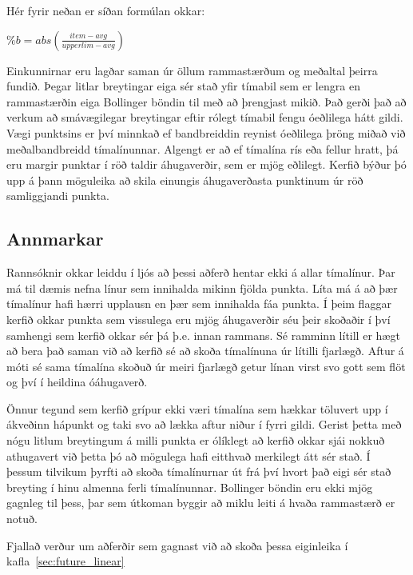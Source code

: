 \documentclass{article}
\begin{document}
Hér fyrir neðan er síðan formúlan okkar:


\begin{center}
  $\%b=abs(\frac{item - avg}{upperlim - avg})$
\end{center}

Einkunnirnar eru lagðar saman úr öllum rammastærðum og meðaltal þeirra fundið.
Þegar litlar breytingar eiga sér stað yfir tímabil sem er lengra en rammastærðin eiga
Bollinger böndin til með að þrengjast mikið. Það gerði það að verkum að smávægilegar breytingar eftir
rólegt tímabil fengu óeðlilega hátt gildi. 
Vægi punktsins er því minnkað ef bandbreiddin reynist óeðlilega þröng miðað við meðalbandbreidd
tímalínunnar.
Algengt er að ef tímalína rís eða fellur hratt, þá eru margir punktar í röð
taldir áhugaverðir, sem er mjög eðlilegt.
Kerfið býður þó upp á þann möguleika að skila einungis áhugaverðasta punktinum
úr röð samliggjandi punkta.

\subsection{Annmarkar}

Rannsóknir okkar leiddu í ljós að þessi aðferð hentar ekki á allar tímalínur.
Þar má til dæmis nefna línur sem innihalda mikinn fjölda punkta.
Líta má á að þær tímalínur hafi \ilqq hærri\irqq \hspace{1pt} upplausn en þær sem innihalda fáa punkta. 
Í þeim flaggar kerfið okkar punkta sem vissulega eru mjög
áhugaverðir séu þeir skoðaðir í því samhengi sem kerfið okkar sér þá þ.e. innan
rammans. Sé ramminn lítill er hægt að bera það saman við að kerfið sé að skoða
tímalínuna úr lítilli fjarlægð. Aftur á móti sé sama tímalína skoðuð úr meiri
fjarlægð getur línan virst svo gott sem flöt og því í heildina óáhugaverð.

Önnur tegund sem kerfið grípur ekki væri tímalína sem hækkar töluvert upp í ákveðinn
hápunkt og taki svo að lækka aftur niður í fyrri gildi. Gerist þetta með nógu
litlum breytingum á milli punkta er ólíklegt að kerfið okkar sjái nokkuð
athugavert við þetta þó að mögulega hafi eitthvað merkilegt átt sér stað. 
Í þessum tilvikum þyrfti að skoða tímalínurnar út frá því hvort
það eigi sér stað breyting í hinu almenna ferli tímalínunnar. Bollinger böndin
eru ekki mjög gagnleg til þess, þar sem útkoman byggir að miklu leiti á hvaða
rammastærð er notuð. 

Fjallað verður um aðferðir sem gagnast við að skoða þessa eiginleika í kafla~\ref{sec:future_linear}
\end{document}
